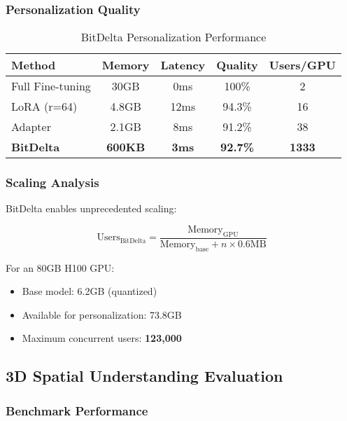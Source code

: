 \subsubsection{Personalization Quality}

\begin{table}[h]
\centering
\caption{BitDelta Personalization Performance}
\begin{tabular}{lcccc}
\hline
\textbf{Method} & \textbf{Memory} & \textbf{Latency} & \textbf{Quality} & \textbf{Users/GPU} \\
\hline
Full Fine-tuning & 30GB & 0ms & 100\% & 2 \\
LoRA (r=64) & 4.8GB & 12ms & 94.3\% & 16 \\
Adapter & 2.1GB & 8ms & 91.2\% & 38 \\
\textbf{BitDelta} & \textbf{600KB} & \textbf{3ms} & \textbf{92.7\%} & \textbf{1333} \\
\hline
\end{tabular}
\end{table}

\subsubsection{Scaling Analysis}

BitDelta enables unprecedented scaling:

\begin{equation}
\text{Users}_{\text{BitDelta}} = \frac{\text{Memory}_{\text{GPU}}}{\text{Memory}_{\text{base}} + n \times 0.6\text{MB}}
\end{equation}

For an 80GB H100 GPU:
\begin{itemize}
    \item Base model: 6.2GB (quantized)
    \item Available for personalization: 73.8GB
    \item Maximum concurrent users: \textbf{123,000}
\end{itemize}

\subsection{3D Spatial Understanding Evaluation}

\subsubsection{Benchmark Performance}

